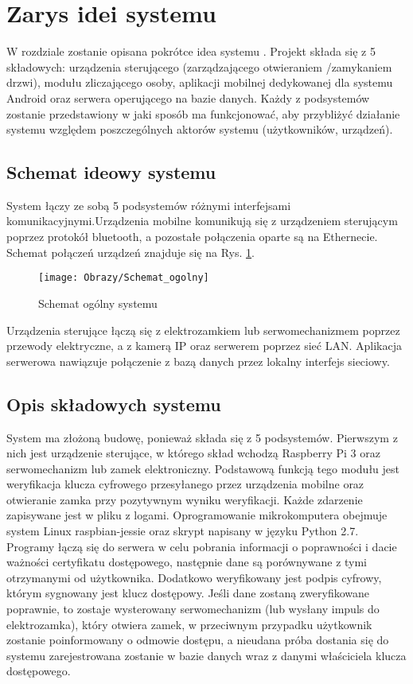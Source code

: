 % 
\newpage\section{Zarys idei systemu \textsl{\NazwaSys}}\label{sec:ideasystemu}
W rozdziale zostanie opisana pokrótce idea systemu \NazwaSys. Projekt składa się z 5 składowych: urządzenia sterującego (zarządzającego otwieraniem /zamykaniem drzwi), modułu zliczającego osoby, aplikacji mobilnej dedykowanej dla systemu Android oraz serwera operującego na bazie danych. Każdy z podsystemów zostanie przedstawiony w jaki sposób ma funkcjonować, aby przybliżyć działanie systemu względem poszczególnych aktorów systemu (użytkowników, urządzeń).

\subsection{Schemat ideowy systemu \textsl{\NazwaSys}}
System łączy ze sobą 5 podsystemów różnymi interfejsami komunikacyjnymi.Urządzenia mobilne komunikują się z urządzeniem sterującym poprzez protokół bluetooth, a pozostałe połączenia oparte są na Ethernecie. Schemat połączeń urządzeń znajduje się na Rys. \ref{Schemat ogólny systemu}.

\begin{figure}[!h]
	\centering
	\texttt{[image: Obrazy/Schemat\_ogolny]}
	\caption{Schemat ogólny systemu}
	\label{Schemat ogólny systemu}
\end{figure}

Urządzenia sterujące łączą się z elektrozamkiem lub serwomechanizmem poprzez przewody elektryczne, a z kamerą IP oraz serwerem poprzez sieć LAN. Aplikacja serwerowa nawiązuje połączenie z bazą danych przez lokalny interfejs sieciowy.

\newpage
\subsection{Opis składowych systemu}
System ma złożoną budowę, ponieważ składa się z 5 podsystemów. Pierwszym z nich jest urządzenie sterujące, w którego skład wchodzą Raspberry Pi 3 oraz serwomechanizm lub zamek elektroniczny. Podstawową funkcją tego modułu jest weryfikacja klucza cyfrowego przesyłanego przez urządzenia mobilne oraz otwieranie zamka przy pozytywnym wyniku weryfikacji. Każde zdarzenie zapisywane jest w pliku z logami. Oprogramowanie mikrokomputera obejmuje system Linux raspbian-jessie oraz skrypt napisany w języku Python 2.7. Programy łączą się do serwera w celu pobrania informacji o poprawności i dacie ważności certyfikatu dostępowego, następnie dane są porównywane z tymi otrzymanymi od użytkownika. Dodatkowo weryfikowany jest podpis cyfrowy, którym sygnowany jest klucz dostępowy. Jeśli dane zostaną zweryfikowane poprawnie, to zostaje wysterowany serwomechanizm (lub wysłany impuls do elektrozamka), który otwiera zamek, w przeciwnym przypadku użytkownik zostanie poinformowany o odmowie dostępu, a nieudana próba dostania się do systemu zarejestrowana zostanie w bazie danych wraz z danymi właściciela klucza dostępowego.

